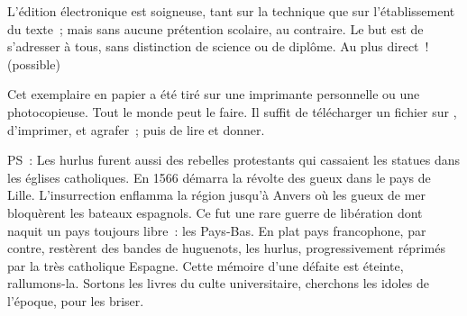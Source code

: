 \documentclass[french,twoside]{book} %
\newif\ifdev
\renewcommand{\LettrineFontHook}{\color{rubric}}
\newcommand{\initialiv}[2]{%
  \let\oldLFH\LettrineFontHook
  \IfSubStr{QJ’}{#1}{
    \lettrine[lines=4, lhang=0.2, loversize=-0.1, lraise=0.2]{\smash{#1}}{#2}
  }{\IfSubStr{É}{#1}{
    \lettrine[lines=4, lhang=0.2, loversize=-0, lraise=0]{\smash{#1}}{#2}
  }{\IfSubStr{ÀÂ}{#1}{
    \lettrine[lines=4, lhang=0.2, loversize=-0, lraise=0, slope=0.6em]{\smash{#1}}{#2}
  }{\IfSubStr{A}{#1}{
    \lettrine[lines=4, lhang=0.2, loversize=0.2, slope=0.6em]{\smash{#1}}{#2}
  }{\IfSubStr{V}{#1}{
    \lettrine[lines=4, lhang=0.2, loversize=0.2, slope=-0.5em]{\smash{#1}}{#2}
  }{
    \lettrine[lines=4, lhang=0.2, loversize=0.2]{\smash{#1}}{#2}
  }}}}}
  \let\LettrineFontHook\oldLFH
}
\renewcommand{\LettrineFontHook}{\bfseries\color{rubric}}
\begin{document}
  L’édition électronique est soigneuse, tant sur la technique
  que sur l’établissement du texte ; mais sans aucune prétention scolaire, au contraire.
  Le but est de s’adresser à tous, sans distinction de science ou de diplôme.
  Au plus direct ! (possible)
  \par

  Cet exemplaire en papier a été tiré sur une imprimante personnelle
   ou une photocopieuse. Tout le monde peut le faire.
  Il suffit de
  télécharger un fichier sur \href{https://hurlus.fr}{},
  d’imprimer, et agrafer ; puis de lire et donner.\par

  \bigskip

  \noindent PS : Les hurlus furent aussi des rebelles protestants qui cassaient les statues dans les églises catholiques. En 1566 démarra la révolte des gueux dans le pays de Lille. L’insurrection enflamma la région jusqu’à Anvers où les gueux de mer bloquèrent les bateaux espagnols.
  Ce fut une rare guerre de libération dont naquit un pays toujours libre : les Pays-Bas.
  En plat pays francophone, par contre, restèrent des bandes de huguenots, les hurlus, progressivement réprimés par la très catholique Espagne.
  Cette mémoire d’une défaite est éteinte, rallumons-la. Sortons les livres du culte universitaire, cherchons les idoles de l’époque, pour les briser.
\fi

\ifdev %
\fontname\font — \textsc{Les règles du jeu}\par
(\hyperref[utopie]{\underline{Lien}})\par
\noindent \initialiv{A}{lors là}\blindtext\par
\noindent \initialiv{À}{ la bonheur des dames}\blindtext\par
\noindent \initialiv{É}{tonnez-le}\blindtext\par
\noindent \initialiv{Q}{ualitativement}\blindtext\par
\noindent \initialiv{V}{aloriser}\blindtext\par
\Blindtext
\phantomsection
\label{utopie}
\Blinddocument
\fi
\end{document}
